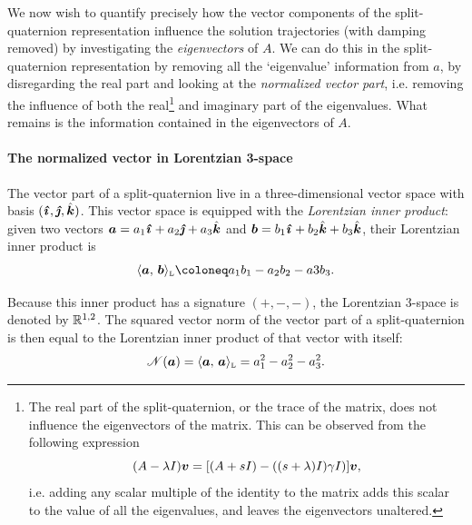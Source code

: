 We now wish to quantify precisely how the vector components of the split-quaternion representation influence the solution trajectories (with damping removed) by investigating the \emph{eigenvectors} of $A$. We can do this in the split-quaternion representation by removing all the `eigenvalue' information from $a$, by disregarding the real part and looking at the \emph{normalized vector part}, i.e. removing the influence of both the real\footnote
{
The real part of the split-quaternion, or the trace of the matrix, does not influence the eigenvectors of the matrix. This can be observed from the following expression
$$ (A - \lambda I)\vec{v} = \qty[(A + s I) - ((s + \lambda) I) \gamma I)]\vec{v}, $$
i.e. adding any scalar multiple of the identity to the matrix adds this scalar to the value of all the eigenvalues, and leaves the eigenvectors unaltered.
}
and imaginary part of the eigenvalues. What remains is the information contained in the eigenvectors of $A$.

\paragraph{The normalized vector in Lorentzian 3-space} The vector part of a split-quaternion live in a three-dimensional vector space with basis $(\quati, \quatj, \quatk)$. This vector space is equipped with the \emph{Lorentzian inner product}: given two vectors $\vec{a} = a_1\quati + a_2\quatj + a_3\quatk$ and $\vec{b}= b_1\quati + b_2\quatk + b_3\quatk$, their Lorentzian inner product is
$$ \lorinner{\vec{a}}{\vec{b}} \coloneq a_1b_1 - a_2b_2 - a3b_3. $$

Because this inner product has a signature $(+,-,-)$, the Lorentzian 3-space is denoted by $\mathbb{R}^{1, 2}$. The squared vector norm of the vector part of a split-quaternion is then equal to the Lorentzian inner product of that vector with itself:
$$ \mathscr{N}(\vec{a}) = \lorinner{\vec{a}}{\vec{a}} = a_1^2 - a_2^2 - a_3^2. $$

